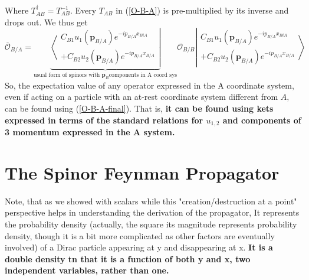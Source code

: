 Where $T_{AB}^{\dagger}=T_{A B}^{-1}$. Every $T_{AB}$ in (\ref{O-B-A}) is pre-multiplied by its inverse and drops out. We thus get
\begin{equation}
\overline{\mathcal{O}}_{B / A}=\underbrace{\left\langle\begin{aligned}
C_{B 1} u_{1}\left(\mathbf{p}_{B / A}\right) e^{-i p_{B / A} x_{B i A}} \\
+C_{B 2} u_{2}\left(\mathbf{p}_{B / A}\right) e^{-i p_{B / A} x_{B / A}}
\end{aligned}\right|}_{\text{usual form of spinors with }\mathbf{p}_B \text{components in A coord sys}}\mathcal{O}_{B/B}\left|\begin{aligned}
C_{B 1} u_{1}\left(\mathbf{p}_{B / A}\right) e^{-i p_{B / A} x_{B i A}} \\
+C_{B 2} u_{2}\left(\mathbf{p}_{B / A}\right) e^{-i p_{B / A} x_{B / A}}
\end{aligned}\right\rangle
\label{O-B-A-final}
\end{equation}
So, the expectation value of any operator expressed in the A coordinate system, even if acting on a particle with an at-rest coordinate system different from $A,$ can be found using (\ref{O-B-A-final}). That is, \textbf{it can be found using kets expressed in terms of the standard relations for $u_{1,2}$ and components of 3 momentum expressed in the A system.}

\section{The Spinor Feynman Propagator}
Note, that as we showed with scalars while this "creation/destruction at a point" perspective helps in understanding the derivation of the propagator,  It represents the probability density (actually, the square its magnitude represents probability density, though it is a bit more complicated as other factors are eventually involved) of a Dirac particle appearing at y and disappearing at x. \textbf{It is a double density tn that it is a function of both y and x, two independent variables, rather than one.}

